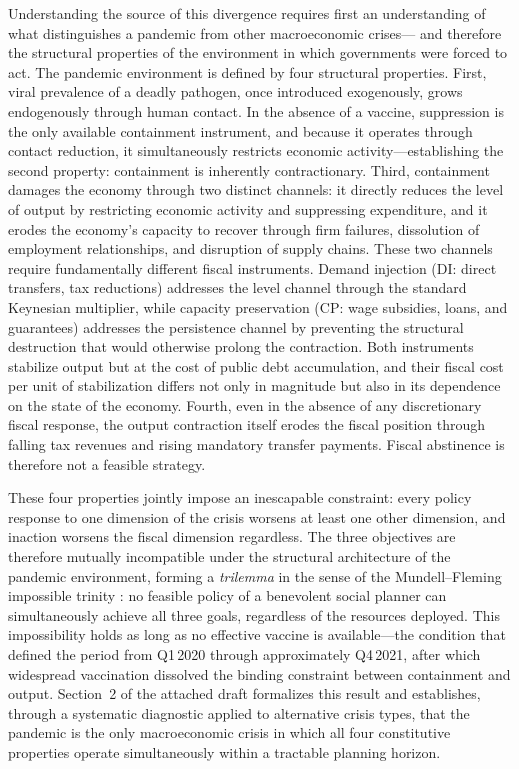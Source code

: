 \documentclass[12pt, a4paper]{article}
\begin{document}
\noindent Understanding the source of this divergence requires first an understanding of what distinguishes a pandemic from other macroeconomic crises--- and therefore the structural properties of the environment in which governments were forced to act. The pandemic environment is defined by four structural properties. First, viral prevalence of a deadly pathogen, once introduced exogenously, grows endogenously through human contact. In the absence of a vaccine, suppression is the only available containment instrument, and because it operates through contact reduction, it simultaneously restricts economic activity---establishing the second property: containment is inherently contractionary. Third, containment damages the economy through two distinct channels: it directly reduces the level of output by restricting economic activity and suppressing expenditure, and it erodes the economy's capacity to recover through firm failures, dissolution of employment relationships, and disruption of supply chains. These two channels require fundamentally different fiscal instruments. Demand injection (DI: direct transfers, tax reductions) addresses the level channel through the standard Keynesian multiplier, while capacity preservation (CP: wage subsidies, loans, and guarantees) addresses the persistence channel by preventing the structural destruction that would otherwise prolong the contraction. Both instruments stabilize output but at the cost of public debt accumulation, and their fiscal cost per unit of stabilization differs not only in magnitude but also in its dependence on the state of the economy. Fourth, even in the absence of any discretionary fiscal response, the output contraction itself erodes the fiscal position through falling tax revenues and rising mandatory transfer payments. Fiscal abstinence is therefore not a feasible strategy. 

These four properties jointly impose an inescapable constraint: every policy response to one dimension of the crisis worsens at least one other dimension, and inaction worsens the fiscal dimension regardless. The three objectives are therefore mutually incompatible under the structural architecture of the pandemic environment, forming a \textit{trilemma} in the sense of the Mundell--Fleming impossible trinity \citep{mundell1963}: no feasible policy of a benevolent social planner can simultaneously achieve all three goals, regardless of the resources deployed. This impossibility holds as long as no effective vaccine is available---the condition that defined the period from Q1\,2020 through approximately Q4\,2021, after which widespread vaccination dissolved the binding constraint between containment and output. Section~2 of the attached draft formalizes this result and establishes, through a systematic diagnostic applied to alternative crisis types, that the pandemic is the only macroeconomic crisis in which all four constitutive properties operate simultaneously within a tractable planning horizon.
\end{document}
